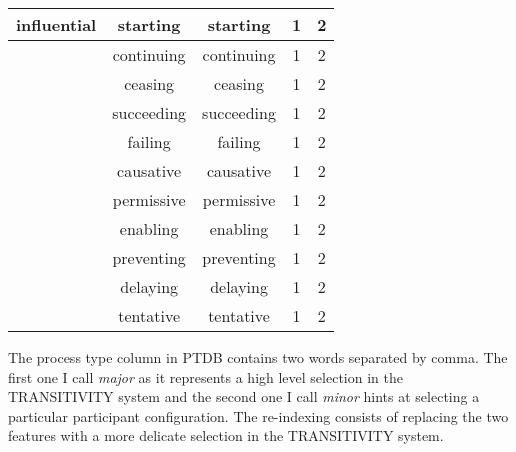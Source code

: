 \begin{table}[H]
\begin{tabular}{|c|c|c|c|c|}
		influential   &    starting     &       starting        &          1           &          2           \\ \hline
		&   continuing    &      continuing       &          1           &          2           \\ \hline
		&     ceasing     &        ceasing        &          1           &          2           \\ \hline
		&   succeeding    &      succeeding       &          1           &          2           \\ \hline
		&     failing     &        failing        &          1           &          2           \\ \hline
		&    causative    &       causative       &          1           &          2           \\ \hline
		&   permissive    &      permissive       &          1           &          2           \\ \hline
		&    enabling     &       enabling        &          1           &          2           \\ \hline
		&   preventing    &      preventing       &          1           &          2           \\ \hline
		&    delaying     &       delaying        &          1           &          2           \\ \hline
		&    tentative    &       tentative       &          1           &          2           \\ \hline
	\end{tabular}
\end{table}

The process type column in PTDB contains two words separated by comma. The first one I call \textit{major} as it represents a high level selection in the TRANSITIVITY system and the second one I call \textit{minor} hints at selecting a particular participant configuration. The re-indexing consists of replacing the two features with a more delicate selection in the TRANSITIVITY system. 


 